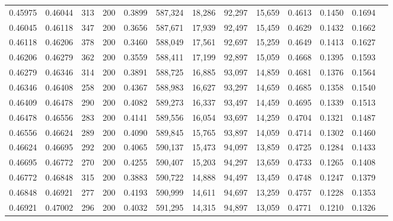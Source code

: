 \begin{tabular}{rrrrrrrrrrrrr}
0.45975 & 0.46044 &   313 & 200 &                                     0.3899 & 587,324 &  18,286 &  92,297 &  15,659 & 0.4613 & 0.1450 & 0.1694 \\
0.46045 & 0.46118 &   347 & 200 &                                     0.3656 & 587,671 &  17,939 &  92,497 &  15,459 & 0.4629 & 0.1432 & 0.1662 \\
0.46118 & 0.46206 &   378 & 200 &                                     0.3460 & 588,049 &  17,561 &  92,697 &  15,259 & 0.4649 & 0.1413 & 0.1627 \\
0.46206 & 0.46279 &   362 & 200 &                                     0.3559 & 588,411 &  17,199 &  92,897 &  15,059 & 0.4668 & 0.1395 & 0.1593 \\
0.46279 & 0.46346 &   314 & 200 &                                     0.3891 & 588,725 &  16,885 &  93,097 &  14,859 & 0.4681 & 0.1376 & 0.1564 \\
0.46346 & 0.46408 &   258 & 200 &                                     0.4367 & 588,983 &  16,627 &  93,297 &  14,659 & 0.4685 & 0.1358 & 0.1540 \\
0.46409 & 0.46478 &   290 & 200 &                                     0.4082 & 589,273 &  16,337 &  93,497 &  14,459 & 0.4695 & 0.1339 & 0.1513 \\
0.46478 & 0.46556 &   283 & 200 &                                     0.4141 & 589,556 &  16,054 &  93,697 &  14,259 & 0.4704 & 0.1321 & 0.1487 \\
0.46556 & 0.46624 &   289 & 200 &                                     0.4090 & 589,845 &  15,765 &  93,897 &  14,059 & 0.4714 & 0.1302 & 0.1460 \\
0.46624 & 0.46695 &   292 & 200 &                                     0.4065 & 590,137 &  15,473 &  94,097 &  13,859 & 0.4725 & 0.1284 & 0.1433 \\
0.46695 & 0.46772 &   270 & 200 &                                     0.4255 & 590,407 &  15,203 &  94,297 &  13,659 & 0.4733 & 0.1265 & 0.1408 \\
0.46772 & 0.46848 &   315 & 200 &                                     0.3883 & 590,722 &  14,888 &  94,497 &  13,459 & 0.4748 & 0.1247 & 0.1379 \\
0.46848 & 0.46921 &   277 & 200 &                                     0.4193 & 590,999 &  14,611 &  94,697 &  13,259 & 0.4757 & 0.1228 & 0.1353 \\
0.46921 & 0.47002 &   296 & 200 &                                     0.4032 & 591,295 &  14,315 &  94,897 &  13,059 & 0.4771 & 0.1210 & 0.1326 \\

\end{tabular}
